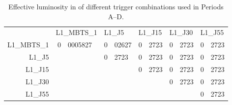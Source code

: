 \begin{table}
\begin{center}
  \begin{tabular}{ r r@{.}l r@{.}l r@{.}l r@{.}l r@{.}l }
                & \multicolumn{2}{l}{L1\_MBTS\_1} & \multicolumn{2}{l}{L1\_J5}  & \multicolumn{2}{l}{L1\_J15} & \multicolumn{2}{l}{L1\_J30} & \multicolumn{2}{l}{L1\_J55} \\
    \cmidrule{2-11}
    L1\_MBTS\_1 & 0&0005827                       & 0&02627                     & 0&2723                      & 0&2723                      & 0&2723                      \\
    L1\_J5      & \multicolumn{2}{l}{}            & 0&2723                      & 0&2723                      & 0&2723                      & 0&2723                      \\
    L1\_J15     & \multicolumn{2}{l}{}            & \multicolumn{2}{l}{}        & 0&2723                      & 0&2723                      & 0&2723                      \\
    L1\_J30     & \multicolumn{2}{l}{}            & \multicolumn{2}{l}{}        & \multicolumn{2}{l}{}        & 0&2723                      & 0&2723                      \\
    L1\_J55     & \multicolumn{2}{l}{}            & \multicolumn{2}{l}{}        & \multicolumn{2}{l}{}        & \multicolumn{2}{l}{}        & 0&2723                      \\
  \end{tabular}
  \caption{Effective luminosity in \ipb of different trigger combinations used in
           Periods A--D.}
  \label{tab:dijets:LumiDijetPeriodAD}
\end{center}
\end{table}

